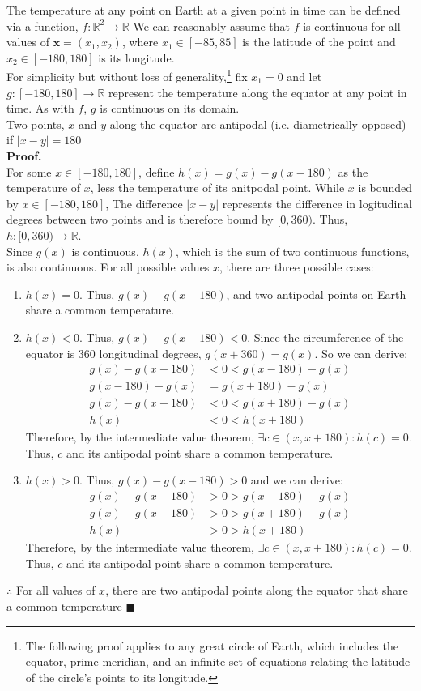 \documentclass{article}
\newcommand{\R}{\mathbb{R}}
\begin{document}
The temperature at any point on Earth at a given point in time can be defined via a function, $f:\R^2\rightarrow\R$ We can reasonably assume that $f$ is continuous for all values of $\mathbf{x}=(x_1,x_2)$, where $x_1\in[-85,85]$ is the latitude of the point and $x_2\in[-180,180]$ is its longitude.
\medskip \\
For simplicity but without loss of generality,\footnote{The following proof applies to any great circle of Earth, which includes the equator, prime meridian, and an infinite set of equations relating the latitude of the circle's points to its longitude.} fix $x_1=0$ and let $g:[-180,180]\rightarrow\R$ represent the temperature along the equator at any point in time. As with $f$, $g$ is continuous on its domain.
\medskip \\
Two points, $x$ and $y$ along the equator are antipodal (i.e. diametrically opposed) if $|x - y|=180$
\medskip \\
\textbf{Proof.}
\smallskip \\
For some $x\in[-180,180]$, define $h(x)=g(x)-g(x-180)$ as the temperature of $x$, less the temperature of its anitpodal point. While $x$ is bounded by $x\in[-180,180]$, The difference $|x-y|$ represents the difference in logitudinal degrees between two points and is therefore bound by $[0,360)$. Thus, $h:[0,360)\rightarrow\R$.
\smallskip \\
Since $g(x)$ is continuous, $h(x)$, which is the sum of two continuous functions, is also continuous. For all possible values $x$, there are three possible cases: 
\begin{enumerate}
	\item $h(x)=0$. Thus, $g(x)-g(x-180)$, and two antipodal points on Earth share a common temperature.
	
	\item $h(x)<0$. Thus, $g(x)-g(x-180)<0$. Since the circumference of the equator is $360$ longitudinal degrees, $g(x+360)=g(x)$. So we can derive:
		\begin{align*}
			g(x)-g(x-180)	&<	0	<	g(x-180) - g(x)	\\
			g(x-180)-g(x)	&=	g(x+180) - g(x)			\\
			g(x)-g(x-180)	&<	0	<	g(x+180) - g(x)	\\
			h(x)			&<	0	<	h(x+180)
		\end{align*}
	Therefore, by the intermediate value theorem, $\exists c\in(x,x+180):h(c)=0$. Thus, $c$ and its antipodal point share a common temperature.
	
	\item $h(x)>0$. Thus, $g(x)-g(x-180)>0$ and we can derive:
		\begin{align*}
			g(x)-g(x-180)	&>	0	>	g(x-180) - g(x)	\\
			g(x)-g(x-180)	&>	0	>	g(x+180) - g(x)	\\
			h(x)			&>	0	>	h(x+180)
		\end{align*}
	Therefore, by the intermediate value theorem, $\exists c\in(x,x+180):h(c)=0$. Thus, $c$ and its antipodal point share a common temperature.
\end{enumerate}
$\therefore$ For all values of $x$, there are two antipodal points along the equator that share a common temperature $\blacksquare$
\end{document}
